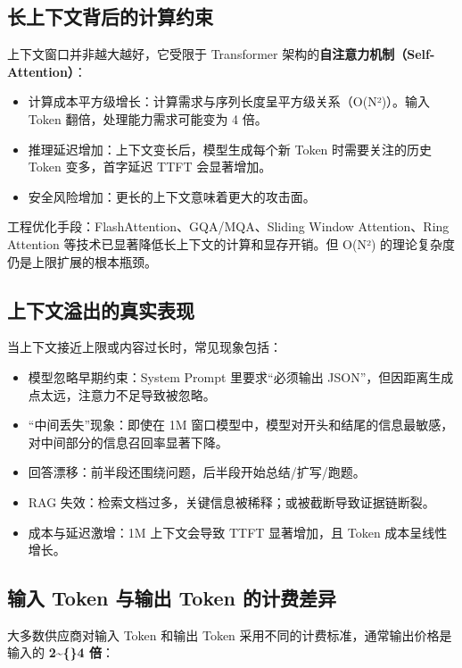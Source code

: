\documentclass[9pt,a4paper,twocolumn]{ctexart}
\begin{document}
\subsection*{长上下文背后的计算约束}


上下文窗口并非越大越好，它受限于 Transformer 架构的\textbf{自注意力机制（Self-Attention）}：


\begin{itemize}[itemsep=1pt, topsep=2pt]
  \item 计算成本平方级增长：计算需求与序列长度呈平方级关系（O(N²)）。输入 Token 翻倍，处理能力需求可能变为 4 倍。
  \item 推理延迟增加：上下文变长后，模型生成每个新 Token 时需要关注的历史 Token 变多，首字延迟 TTFT 会显著增加。
  \item 安全风险增加：更长的上下文意味着更大的攻击面。
\end{itemize}


工程优化手段：FlashAttention、GQA/MQA、Sliding Window Attention、Ring Attention 等技术已显著降低长上下文的计算和显存开销。但 O(N²) 的理论复杂度仍是上限扩展的根本瓶颈。



\subsection*{上下文溢出的真实表现}


当上下文接近上限或内容过长时，常见现象包括：


\begin{itemize}[itemsep=1pt, topsep=2pt]
  \item 模型忽略早期约束：System Prompt 里要求“必须输出 JSON”，但因距离生成点太远，注意力不足导致被忽略。
  \item “中间丢失”现象：即使在 1M 窗口模型中，模型对开头和结尾的信息最敏感，对中间部分的信息召回率显著下降。
  \item 回答漂移：前半段还围绕问题，后半段开始总结/扩写/跑题。
  \item RAG 失效：检索文档过多，关键信息被稀释；或被截断导致证据链断裂。
  \item 成本与延迟激增：1M 上下文会导致 TTFT 显著增加，且 Token 成本呈线性增长。
\end{itemize}


\subsection*{输入 Token 与输出 Token 的计费差异}


大多数供应商对输入 Token 和输出 Token 采用不同的计费标准，通常输出价格是输入的 \textbf{2\textasciitilde\{\}4 倍}：
\end{document}
